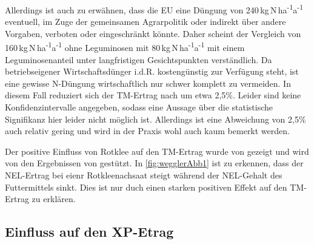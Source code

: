 Allerdings ist auch zu erwähnen, dass die \ac{EU} eine Düngung von 240\,kg\,N\,ha\textsuperscript{-1}a\textsuperscript{-1} eventuell, im Zuge der gemeinsamen Agrarpolitik oder indirekt über andere Vorgaben, verboten oder eingeschränkt könnte.
Daher scheint der Vergleich von 160\,kg\,N\,ha\textsuperscript{-1}a\textsuperscript{-1} ohne Leguminosen mit 80\,kg\,N\,ha\textsuperscript{-1}a\textsuperscript{-1} mit einem Leguminosenanteil unter langfristigen Gesichtspunkten verständlich.
Da betriebseigener Wirtschaftsdünger i.d.R. kostengünstig zur Verfügung steht, ist eine gewisse N-Düngung wirtschaftlich nur schwer komplett zu vermeiden.
In diesem Fall reduziert sich der \ac{TM}-Ertrag nach \textcite[11]{engel2013protein} um etwa 2,5\%.
Leider sind keine Konfidenzintervalle angegeben, sodass eine Aussage über die statistische Signifikanz hier leider nicht möglich ist.
Allerdings ist eine Abweichung von 2,5\% auch relativ gering und wird in der Praxis wohl auch kaum bemerkt werden.

Der positive Einfluss von Rotklee auf den \ac{TM}-Ertrag wurde von \textcite[242]{FrankowLindberg2009} gezeigt und wird von den Ergebnissen von \textcite[35]{weggler2050leguminosen} gestützt.
In \cref{fig:wegglerAbb1} ist zu erkennen, dass der \ac{NEL}-Ertrag bei eienr Rotkleenachsaat steigt während der \ac{NEL}-Gehalt des Futtermittels sinkt.
Dies ist nur duch einen starken positiven Effekt auf den \ac{TM}-Ertrag zu erklären.



\subsection{Einfluss auf den \acl{XP}-Etrag}
\label{subsec:Protein}

